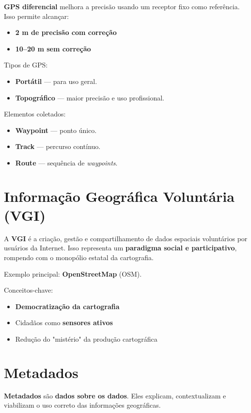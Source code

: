 \textbf{GPS diferencial} melhora a precisão usando um receptor fixo como referência. Isso permite alcançar:
\begin{itemize}
\item \textbf{2 m de precisão com correção}
\item \textbf{10–20 m sem correção}
\end{itemize}

Tipos de GPS:
\begin{itemize}
\item \textbf{Portátil} — para uso geral.
\item \textbf{Topográfico} — maior precisão e uso profissional.
\end{itemize}

Elementos coletados:
\begin{itemize}
\item \textbf{Waypoint} — ponto único.
\item \textbf{Track} — percurso contínuo.
\item \textbf{Route} — sequência de \emph{waypoints}.
\end{itemize}

\section{Informação Geográfica Voluntária (VGI)}

A \textbf{VGI} é a criação, gestão e compartilhamento de dados espaciais voluntários por usuários da Internet. Isso representa um \textbf{paradigma social e participativo}, rompendo com o monopólio estatal da cartografia.

Exemplo principal: \textbf{OpenStreetMap} (OSM).

Conceitos-chave:
\begin{itemize}
\item \textbf{Democratização da cartografia}
\item Cidadãos como \textbf{sensores ativos}
\item Redução do "mistério" da produção cartográfica
\end{itemize}

\section{Metadados}

\textbf{Metadados} são \textbf{dados sobre os dados}. Eles explicam, contextualizam e viabilizam o uso correto das informações geográficas.

